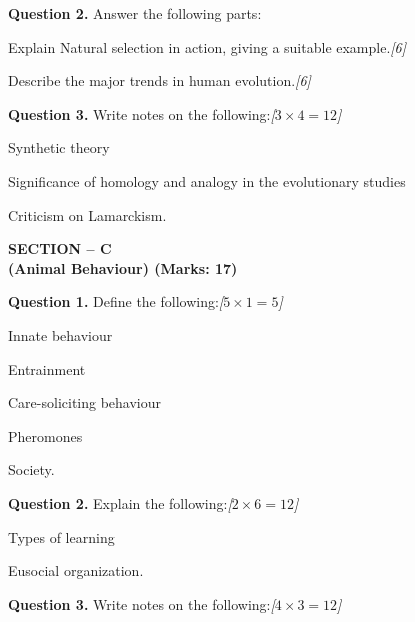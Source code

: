 \documentclass[11pt,a4paper]{article}
\newcommand{\pts}[1]{\hfill   \textit{[#1]}}
\begin{document}
\medskip


\noindent   \textbf{Question 2.} Answer the following parts:

\begin{parts}
  \item Explain Natural selection in action, giving a suitable example.\pts{6}
  \item Describe the major trends in human evolution.\pts{6}
\end{parts}

\medskip


\noindent   \textbf{Question 3.} Write notes on the following:\pts{$3  \times 4 = 12$}

\begin{parts}
  \item Synthetic theory
  \item Significance of homology and analogy in the evolutionary studies
  \item Criticism on Lamarckism.
\end{parts}

\pagebreak

\begin{center}
   \textbf{SECTION -- C} \\
   \textbf{(Animal Behaviour) (Marks: 17)}
\end{center}

\medskip


\noindent   \textbf{Question 1.} Define the following:\pts{$5  \times 1 = 5$}

\begin{parts}
  \item Innate behaviour
  \item Entrainment
  \item Care-soliciting behaviour
  \item Pheromones
  \item Society.
\end{parts}

\medskip


\noindent   \textbf{Question 2.} Explain the following:\pts{$2  \times 6 = 12$}

\begin{parts}
  \item Types of learning
  \item Eusocial organization.
\end{parts}

\medskip


\noindent   \textbf{Question 3.} Write notes on the following:\pts{$4  \times 3 = 12$}
\end{document}
